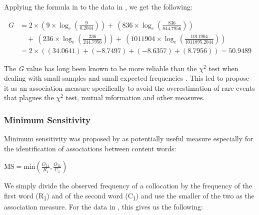Applying the formula in  to the data in , we get the following:

\begin{equation*}
\begin{split}
G & = 2 \times \left( 9 \times \log_e \left( \frac{9}{0.2044} \right) \right) +\ \left( 836 \times \log_e \left( \frac{836}{844.7956} \right) \right)\\
& \quad +\ \left( 236 \times \log_e \left( \frac{236}{244.7956} \right) \right) +\ \left( 1011904 \times \log_e \left( \frac{1011904}{1011895.2044} \right) \right)\\
& = 2 \times \left( \left( 34.0641 \right) + \left( -8.7497 \right) + \left( -8.6357 \right) + \left( 8.7956 \right) \right) = 50.9489
\end{split}
\end{equation*}

The \emph{G}  value has long been known to be more reliable than the $\chi^2$  test when dealing with small samples and small expected  frequencies \citep[134ff]{read_goodness--fit_1988}. This led \citet{dunning_accurate_1993} to propose it as an association  measure  specifically to avoid the overestimation of rare events that plagues the $\chi^2$  test, mutual information  and other measures.

\subsubsection{Minimum Sensitivity}
\label{sec:amminimumsensitivity}

Minimum sensitivity  was proposed by \citet{pedersen_dependent_1998} as potentially useful measure especially for the identification of associations  between content words:

\begin{exe}
\ex $\displaystyle{\text{MS} = \text{min} \left ( \frac{O_{11}}{R_1},\frac{O_{11}}{C_1} \right )}$
\label{ex:minsens}
\end{exe}

We simply divide the observed frequency  of a collocation  by the frequency of the first word (R\textsubscript{1}) and of the second word (C\textsubscript{1}) and use the smaller of the two as the association  measure.  For the data in , this gives us the following:

